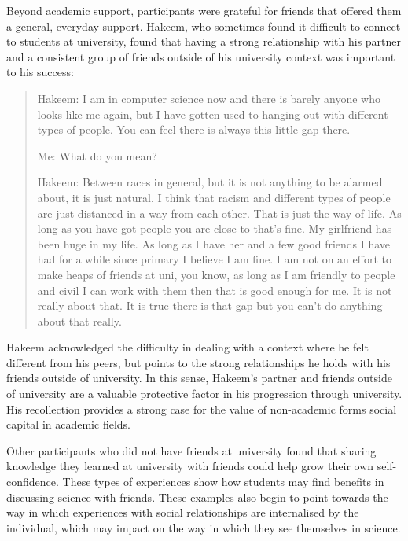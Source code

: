 Beyond academic support, participants were grateful for friends that offered them a general, everyday support. Hakeem, who sometimes found it difficult to connect to students at university, found that having a strong relationship with his partner and a consistent group of friends outside of his university context was important to his success: \blockquote{

Hakeem: I am in computer science now and there is barely anyone who looks like me again, but I have gotten used to hanging out with different types of people. You can feel there is always this little gap there.

Me:	What do you mean?

Hakeem:	Between races in general, but it is not anything to be alarmed about, it is just natural. I think that racism and different types of people are just distanced in a way from each other. That is just the way of life. As long as you have got people you are close to that’s fine. My girlfriend has been huge in my life. As long as I have her and a few good friends I have had for a while since primary I believe I am fine. I am not on an effort to make heaps of friends at uni, you know, as long as I am friendly to people and civil I can work with them then that is good enough for me. It is not really about that. It is true there is that gap but you can’t do anything about that really. 
} Hakeem acknowledged the difficulty in dealing with a context where he felt different from his peers, but points to the strong relationships he holds with his friends outside of university. In this sense, Hakeem's partner and friends outside of university are a valuable protective factor in his progression through university. His recollection provides a strong case for the value of non-academic forms social capital in academic fields.

Other participants who did not have friends at university found that sharing knowledge they learned at university with friends could help grow their own self-confidence. These types of experiences show how students may find benefits in discussing science with friends. These examples also begin to point towards the way in which experiences with social relationships are internalised by the individual, which may impact on the way in which they see themselves in science.


